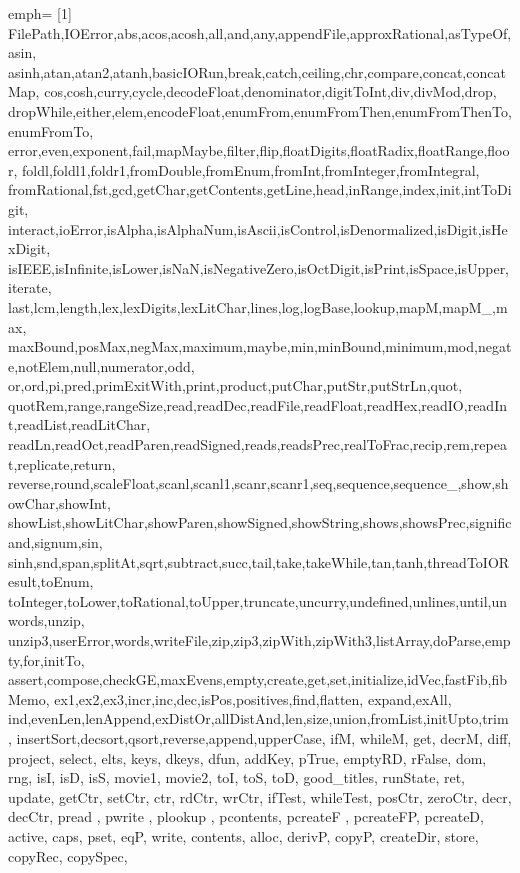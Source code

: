 {%
	emph=
	{[1]
		FilePath,IOError,abs,acos,acosh,all,and,any,appendFile,approxRational,asTypeOf,asin,
		asinh,atan,atan2,atanh,basicIORun,break,catch,ceiling,chr,compare,concat,concatMap,
		cos,cosh,curry,cycle,decodeFloat,denominator,digitToInt,div,divMod,drop,
		dropWhile,either,elem,encodeFloat,enumFrom,enumFromThen,enumFromThenTo,enumFromTo,
		error,even,exponent,fail,mapMaybe,filter,flip,floatDigits,floatRadix,floatRange,floor,
		foldl,foldl1,foldr1,fromDouble,fromEnum,fromInt,fromInteger,fromIntegral,
		fromRational,fst,gcd,getChar,getContents,getLine,head,inRange,index,init,intToDigit,
		interact,ioError,isAlpha,isAlphaNum,isAscii,isControl,isDenormalized,isDigit,isHexDigit,
		isIEEE,isInfinite,isLower,isNaN,isNegativeZero,isOctDigit,isPrint,isSpace,isUpper,iterate,
		last,lcm,length,lex,lexDigits,lexLitChar,lines,log,logBase,lookup,mapM,mapM_,max,
		maxBound,posMax,negMax,maximum,maybe,min,minBound,minimum,mod,negate,notElem,null,numerator,odd,
		or,ord,pi,pred,primExitWith,print,product,putChar,putStr,putStrLn,quot,
		quotRem,range,rangeSize,read,readDec,readFile,readFloat,readHex,readIO,readInt,readList,readLitChar,
		readLn,readOct,readParen,readSigned,reads,readsPrec,realToFrac,recip,rem,repeat,replicate,return,
		reverse,round,scaleFloat,scanl,scanl1,scanr,scanr1,seq,sequence,sequence_,show,showChar,showInt,
		showList,showLitChar,showParen,showSigned,showString,shows,showsPrec,significand,signum,sin,
		sinh,snd,span,splitAt,sqrt,subtract,succ,tail,take,takeWhile,tan,tanh,threadToIOResult,toEnum,
		toInteger,toLower,toRational,toUpper,truncate,uncurry,undefined,unlines,until,unwords,unzip,
		unzip3,userError,words,writeFile,zip,zip3,zipWith,zipWith3,listArray,doParse,empty,for,initTo,
        assert,compose,checkGE,maxEvens,empty,create,get,set,initialize,idVec,fastFib,fibMemo,
        ex1,ex2,ex3,incr,inc,dec,isPos,positives,find,flatten, expand,exAll,
				ind,evenLen,lenAppend,exDistOr,allDistAnd,len,size,union,fromList,initUpto,trim,
        insertSort,decsort,qsort,reverse,append,upperCase, ifM, whileM, get, decrM, diff,
        project, select, elts, keys, dkeys, dfun, addKey, pTrue, emptyRD, rFalse,
                dom, rng, isI, isD, isS, movie1, movie2,  toI, toS, toD, good_titles, runState, ret,
                update, getCtr, setCtr, ctr, rdCtr, wrCtr, ifTest, whileTest, posCtr, zeroCtr, decr, decCtr,
                pread , pwrite , plookup , pcontents, pcreateF , pcreateFP, pcreateD, active, caps, pset, eqP,
                write, contents, alloc, derivP, copyP, createDir, store, copyRec, copySpec,
}}
